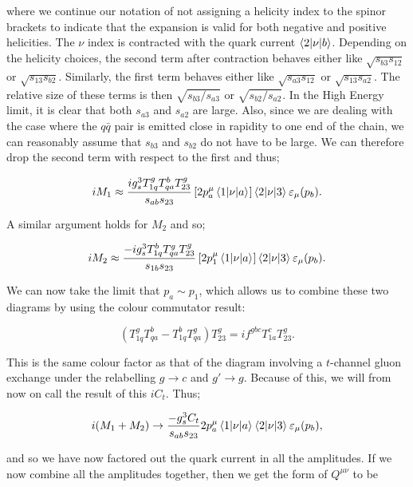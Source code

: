 where we continue our notation of not assigning a helicity index to the spinor brackets to indicate that the expansion is valid for both negative and positive helicities. The $\nu$ index is contracted with the quark current $\mathinner{\langle2\vert\nu\vert b\rangle}_{}$. Depending on the helicity choices, the second term after contraction behaves either like $\sqrt{s_{b3} s_{12}}$ or $\sqrt{s_{13} s_{b2}}$. Similarly, the first term behaves either like $\sqrt{s_{a3} s_{12}}$ or $\sqrt{s_{13} s_{a2}}$. The relative size of these terms is then $\sqrt{s_{b3}/s_{a3}}$ or $\sqrt{s_{b2}/s_{a2}}$. In the High Energy limit, it is clear that both $s_{a3}$ and $s_{a2}$ are large. Also, since we are dealing with the case where the $q\bar{q}$ pair is emitted close in rapidity to one end of the chain, we can reasonably assume that $s_{b3}$ and $s_{b2}$ do not have to be large. We can therefore drop the second term with respect to the first and thus;

\begin{equation}
iM_1 \approx \frac{i g_s^3 T^g_{1q}T^b_{qa}T^g_{23}}{s_{ab}s_{23}} \left[ 2p_a^\mu \mathinner{\langle1\vert\nu\vert a\rangle}_{} \right] \mathinner{\langle2\vert\nu\vert3\rangle}_{} \varepsilon_\mu (p_b).
\end{equation}

A similar argument holds for $M_2$ and so;

\begin{equation}
iM_2 \approx \frac{-i g_s^3 T^b_{1q}T^g_{qa}T^g_{23}}{s_{1b}s_{23}} \left[ 2p_1^\mu \mathinner{\langle1\vert\nu\vert a\rangle}_{} \right] \mathinner{\langle2\vert\nu\vert3\rangle}_{} \varepsilon_\mu (p_b).
\end{equation}

We can now take the limit that $p_a \sim p_1$, which allows us to combine these two diagrams by using the colour commutator result:

\begin{equation}
(T^g_{1q}T^b_{qa}- T^b_{1q}T^g_{qa})T^g_{23} = i f^{gbc}T^c_{1a}T^g_{23}.
\end{equation}

This is the same colour factor as that of the diagram involving a $t$-channel gluon exchange under the relabelling $g \to c$ and $g' \to g$. Because of this, we will from now on call the result of this $i C_t$. Thus;

\begin{equation}
i(M_1 + M_2) \to \frac{- g_s^3 C_t}{s_{ab}s_{23}}2p_a^\mu \mathinner{\langle1\vert\nu\vert a\rangle}_{} \mathinner{\langle2\vert\nu\vert3\rangle}_{} \varepsilon_\mu (p_b),
\end{equation}

and so we have now factored out the quark current in all the amplitudes. If we now combine all the amplitudes together, then we get the form of $Q^{\mu \nu}$ to be

